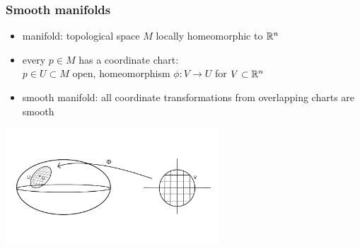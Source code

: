 \begin{frame}
  \frametitle{Smooth manifolds}
  \begin{itemize}
    \item manifold:  topological space $M$ locally homeomorphic to $\mathbb{R}^n$

    \item every $p\in M$ has a coordinate chart:\\$p\in U\subset M$ open, homeomorphism $\phi\colon V\to U$ for $V\subset \mathbb{R}^n$

    \item smooth manifold: all coordinate transformations from overlapping charts are smooth
  \end{itemize}
  \includegraphics[width=8cm]{images/surface_with_chart.png}
\end{frame}

